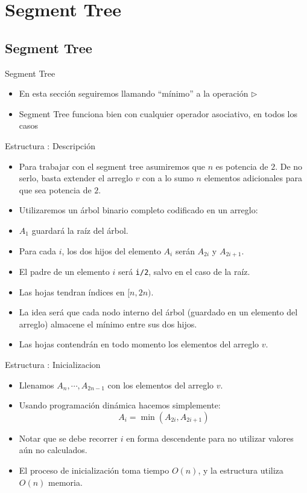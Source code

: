 \documentclass{beamer}
\DeclareMathOperator*{\mimin}{min}
\begin{document}
\section{Segment Tree}

\subsection{Segment Tree}

\begin{frame}{Segment Tree}
    \begin{itemize}
      \item En esta sección seguiremos llamando ``mínimo'' a la operación $\triangleright$
      \item Segment Tree funciona bien con cualquier operador asociativo, en todos los casos
    \end{itemize}
\end{frame}

\begin{frame}{Estructura : Descripción}
    \begin{itemize}
      \item Para trabajar con el segment tree asumiremos que $n$ es potencia de $2$. De no serlo, basta extender el arreglo $v$ con a lo sumo $n$
            elementos adicionales para que sea potencia de $2$.
      \item Utilizaremos un árbol binario completo codificado en un arreglo: 
      \item $A_1$ guardará la raíz del árbol.
      \item Para cada $i$, los dos hijos del elemento $A_i$ serán $A_{2i}$ y $A_{2i+1}$. 
      \item El padre de un elemento $i$ será \texttt{i/2}, salvo en el caso de la raíz.
      \item Las hojas tendran índices en $[n,2n)$.
      \item La idea será que cada nodo interno del árbol (guardado en un elemento del arreglo) almacene el mínimo entre sus dos hijos.
      \item Las hojas contendrán en todo momento los elementos del arreglo $v$.
    \end{itemize}
\end{frame}

\begin{frame}{Estructura : Inicializacion}
    \begin{itemize}
       \item Llenamos $A_n, \cdots, A_{2n-1}$ con los elementos del arreglo $v$.
       \item Usando programación dinámica hacemos simplemente:
        $$A_i = \mimin(A_{2i},A_{2i+1})$$
        \item Notar que se debe recorrer $i$ en forma descendente para no utilizar valores aún no calculados.
        \item El proceso de inicialización toma tiempo $O(n)$, y la estructura utiliza $O(n)$ memoria.
    \end{itemize}
\end{frame}
\end{document}
